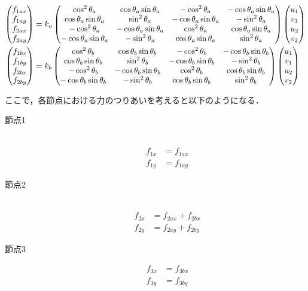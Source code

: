 \documentclass[a4paper,11pt,uplatex]{jsarticle}
\begin{document}
\begin{align}
  \label{9}
  \begin{pmatrix} f_{1ax} \\ f_{1ay} \\ f_{2ax} \\ f_{2ay} \end{pmatrix} &=  k_a \begin{pmatrix} \cos^2 \theta_a & \cos \theta_a \sin \theta_a & -\cos^2 \theta_a & -\cos \theta_a \sin \theta_a \\ \cos \theta_a \sin \theta_a & \sin^2 \theta_a & -\cos \theta_a \sin \theta_a
  & -\sin^2 \theta_a \\ -\cos^2 \theta_a & -\cos \theta_a \sin \theta_a & \cos^2 \theta_a & \cos \theta_a \sin \theta_a \\ -\cos \theta_a \sin \theta_a & -\sin^2 \theta_a& \cos \theta_a \sin \theta_a
  & \sin^2 \theta_a \end{pmatrix} \begin{pmatrix} u_1 \\ v_1 \\ u_2 \\ v_2 \end{pmatrix} \\
  \label{10}
  \begin{pmatrix} f_{1bx} \\ f_{1by} \\ f_{2bx} \\ f_{2by} \end{pmatrix} &= k_b \begin{pmatrix} \cos^2 \theta_b & \cos \theta_b \sin \theta_b & -\cos^2 \theta_b & -\cos \theta_b \sin \theta_b \\ \cos \theta_b \sin \theta_b & \sin^2 \theta_b & -\cos \theta_b \sin \theta_b
  & -\sin^2 \theta_b \\ -\cos^2 \theta_b & -\cos \theta_b \sin \theta_b & \cos^2 \theta_b & \cos \theta_b \sin \theta_b \\ -\cos \theta_b \sin \theta_b & -\sin^2 \theta_b & \cos \theta_b \sin \theta_b
  & \sin^2 \theta_b \end{pmatrix} \begin{pmatrix} u_1 \\ v_1 \\ u_2 \\ v_2 \end{pmatrix}
\end{align}

ここで，各節点における力のつりあいを考えると以下のようになる．
\begin{description}
  \item[節点1]　
  \begin{align}
    f_{1x} &= f_{1ax} \\
    f_{1y} &= f_{1ay}
  \end{align}
  \item[節点2]　
  \begin{align}
    f_{2x} &= f_{2ax} + f_{2bx} \\
    f_{2y} &= f_{2ay} + f_{2by}
  \end{align}
  \item[節点3]
  \begin{align}
    f_{3x} &= f_{3bx} \\
    f_{3y} &= f_{3by}
  \end{align}
\end{description}
\end{document}
